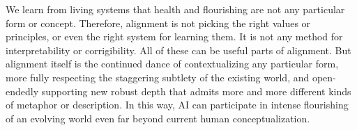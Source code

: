 \documentclass[11pt]{article}
\begin{document}



We learn from living systems that health and flourishing are not any particular form or concept. Therefore, alignment is not picking the right values or principles, or even the right system for learning them. It is not any method for interpretability or corrigibility. All of these can be useful parts of alignment. But alignment itself is the continued dance of contextualizing any particular form, more fully respecting the staggering subtlety of the existing world, and open-endedly supporting new robust depth that admits more and more different kinds of metaphor or description. In this way, AI can participate in intense flourishing of an evolving world even far beyond current human conceptualization.






\end{document}
